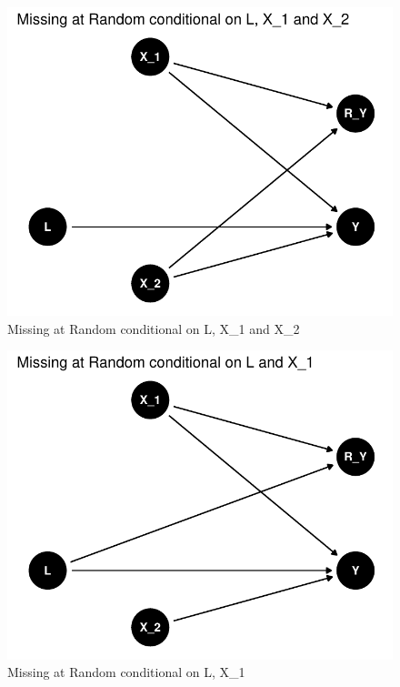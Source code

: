 \documentclass{article}
\newcommand{\pandocbounded}[1]{#1}
\begin{document}
\begin{figure}
\centering
\pandocbounded{\includegraphics[keepaspectratio]{Final_Report_files/figure-latex/unnamed-chunk-2-1.pdf}}
\caption{Missing at Random conditional on L, X\_1 and X\_2}
\end{figure}

\begin{figure}
\centering
\pandocbounded{\includegraphics[keepaspectratio]{Final_Report_files/figure-latex/unnamed-chunk-3-1.pdf}}
\caption{Missing at Random conditional on L, X\_1}
\end{figure}
\end{document}
